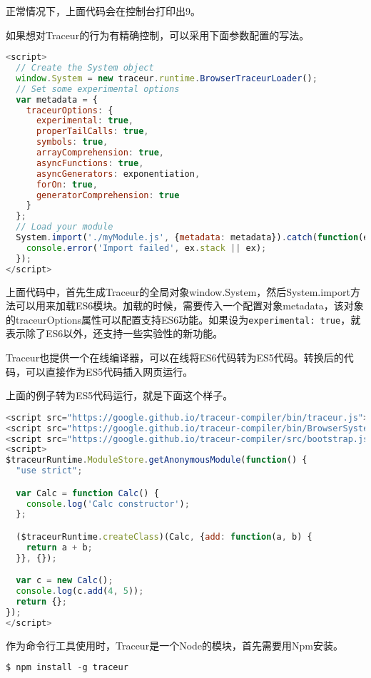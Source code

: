正常情况下，上面代码会在控制台打印出9。

如果想对Traceur的行为有精确控制，可以采用下面参数配置的写法。

\begin{lstlisting}[language=JavaScript]
<script>
  // Create the System object
  window.System = new traceur.runtime.BrowserTraceurLoader();
  // Set some experimental options
  var metadata = {
    traceurOptions: {
      experimental: true,
      properTailCalls: true,
      symbols: true,
      arrayComprehension: true,
      asyncFunctions: true,
      asyncGenerators: exponentiation,
      forOn: true,
      generatorComprehension: true
    }
  };
  // Load your module
  System.import('./myModule.js', {metadata: metadata}).catch(function(ex) {
    console.error('Import failed', ex.stack || ex);
  });
</script>
\end{lstlisting}


上面代码中，首先生成Traceur的全局对象window.System，然后System.import方法可以用来加载ES6模块。加载的时候，需要传入一个配置对象metadata，该对象的traceurOptions属性可以配置支持ES6功能。如果设为\texttt{experimental: true}，就表示除了ES6以外，还支持一些实验性的新功能。


Traceur也提供一个在线编译器，可以在线将ES6代码转为ES5代码。转换后的代码，可以直接作为ES5代码插入网页运行。

上面的例子转为ES5代码运行，就是下面这个样子。


\begin{lstlisting}[language=JavaScript]
<script src="https://google.github.io/traceur-compiler/bin/traceur.js"></script>
<script src="https://google.github.io/traceur-compiler/bin/BrowserSystem.js"></script>
<script src="https://google.github.io/traceur-compiler/src/bootstrap.js"></script>
<script>
$traceurRuntime.ModuleStore.getAnonymousModule(function() {
  "use strict";

  var Calc = function Calc() {
    console.log('Calc constructor');
  };

  ($traceurRuntime.createClass)(Calc, {add: function(a, b) {
    return a + b;
  }}, {});

  var c = new Calc();
  console.log(c.add(4, 5));
  return {};
});
</script>
\end{lstlisting}

作为命令行工具使用时，Traceur是一个Node的模块，首先需要用Npm安装。



\begin{lstlisting}[language=JavaScript]
$ npm install -g traceur
\end{lstlisting}

